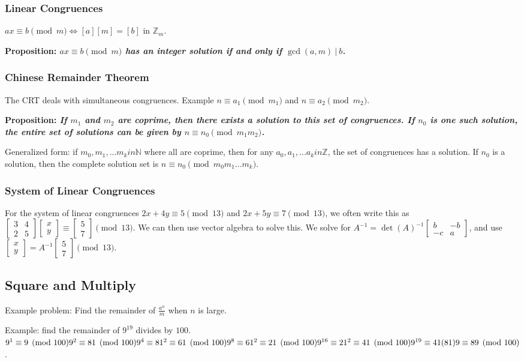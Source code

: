 \documentclass[12pt]{article}
\newcommand{\divides}{\ \!|\ \!}
\newcommand{\matrixtwo}[4]{\begin{bmatrix}#1 & #2\\#3 & #4\end{bmatrix}}
\newcommand{\proposition}[1]{{\bf Proposition: \textit{#1}}}
\newcommand{\vectwo}[2]{\begin{bmatrix}#1\\#2\end{bmatrix}}
\begin{document}
\subsubsection*{Linear Congruences}
$ax \equiv b \pmod m \iff [a][m] = [b]$ in $\mathbb{Z}_m$.

\proposition{$ax \equiv b \pmod m$ has an integer solution if and only if $\gcd(a,m)\divides b$.}

\subsubsection*{Chinese Remainder Theorem}
The CRT deals with simultaneous congruences. Example $n \equiv a_1 \pmod m_1$ and $n \equiv a_2 \pmod m_2$.

\proposition{If $m_1$ and $m_2$ are coprime, then there exists a solution to this set of congruences. If $n_0$ is one such solution, the entire set of solutions can be given by $n \equiv n_0 \pmod{m_1m_2}$.}

Generalized form: if $m_0, m_1, ... m_k in \mathbb{N}$ where all are coprime, then for any $a_0, a_1, ... a_k in \mathbb{Z}$, the set of congruences has a solution. If $n_0$ is a solution, then the complete solution set is $n \equiv n_0 \pmod{m_0m_1...m_k}$.

\subsubsection*{System of Linear Congruences}
For the system of linear congruences $2x + 4y \equiv 5 \pmod{13}$ and $2x + 5y \equiv 7 \pmod{13}$, we often write this as $\matrixtwo{3}{4}{2}{5} \vectwo{x}{y} \equiv \vectwo{5}{7} \pmod{13}$. We can then use vector algebra to solve this. We solve for $A^{-1} = \det(A)^{-1} \matrixtwo{b}{-b}{-c}{a}$, and use $\vectwo{x}{y} = A^{-1} \vectwo{5}{7} \pmod{13}$.

\subsection*{Square and Multiply}
Example problem: Find the remainder of $\frac{a^n}{m}$ when $n$ is large.

Example: find the remainder of $9^19$ divides by $100$.\\
$9^1 \equiv 9 \pmod{100}\\
9^2 \equiv 81 \pmod{100}\\
9^4 \equiv 81^2 \equiv 61 \pmod{100}\\
9^8 \equiv 61^2 \equiv 21 \pmod{100}\\
9^{16} \equiv 21^2 \equiv 41 \pmod{100}\\
9^{19} \equiv 41(81)9 \equiv 89 \pmod{100}$.
\end{document}
